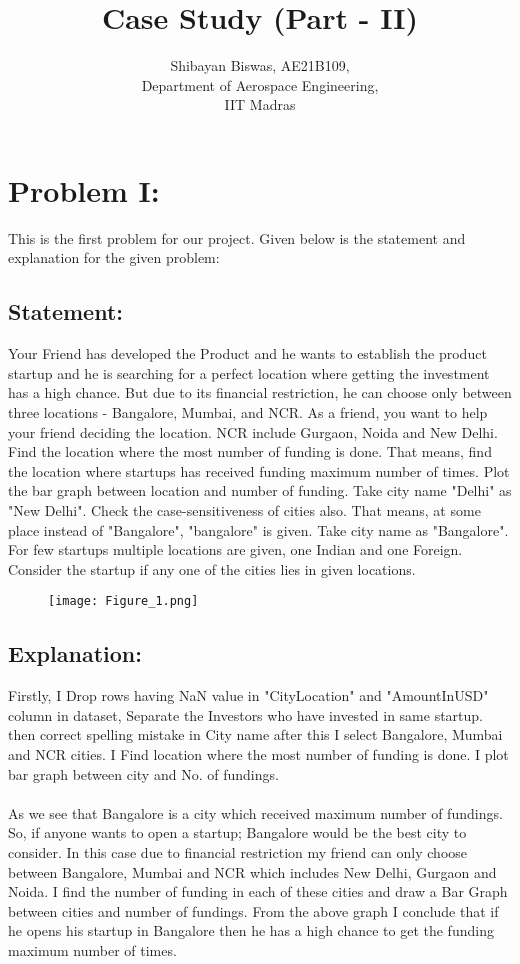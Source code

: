 \documentclass[12pt,a4paper]{article}
\author{Shibayan Biswas, AE21B109,\\ Department of Aerospace Engineering,\\ IIT Madras}
\title{Case Study (Part - II)}
\begin{document}
\maketitle

\hline

\section{Problem I:}
This is the first problem for our project. Given below is the statement and explanation for the given problem:
\subsection{Statement:}
Your Friend has developed the Product and he wants to establish the product startup and he is searching for a perfect location where getting the investment has a high chance. But due to its financial restriction, he can choose only between three locations - Bangalore, Mumbai, and NCR. As a friend, you want to help your friend deciding the location. NCR include Gurgaon, Noida and New Delhi. Find the location where the most number of funding is done. That means, find the location where startups has received funding maximum number of
times. Plot the bar graph between location and number of funding. Take city name "Delhi" as "New Delhi". Check the case-sensitiveness of cities also. That means, at some place instead of "Bangalore", "bangalore" is given. Take city name as "Bangalore". For few startups multiple locations are given, one Indian and one Foreign. Consider the startup if any one of the cities lies in given locations.
\begin{figure}[!ht]
	\begin{center}
			\texttt{[image: Figure\_1.png]}
	\end{center}
\end{figure}
\clearpage
\subsection{Explanation:}
Firstly, I Drop rows having NaN value in "CityLocation" and "AmountInUSD" column in dataset, Separate the Investors who have invested in same startup. then correct spelling mistake in City name after this I select Bangalore, Mumbai and NCR cities. I Find location where the most number of funding is done. I plot bar graph between city and No. of fundings.\\
\\As we see that Bangalore is a city which received maximum number of fundings. So, if anyone wants to open a startup; Bangalore would be the best city to consider. In this case due to financial restriction my friend can only
choose between Bangalore, Mumbai and NCR which includes New Delhi, Gurgaon and Noida. I find the number of funding in each of these cities and draw a Bar Graph between cities and number of fundings. From the above graph I conclude that if he opens his startup in Bangalore then he has a high chance to get the funding maximum
number of times.
\end{document}
